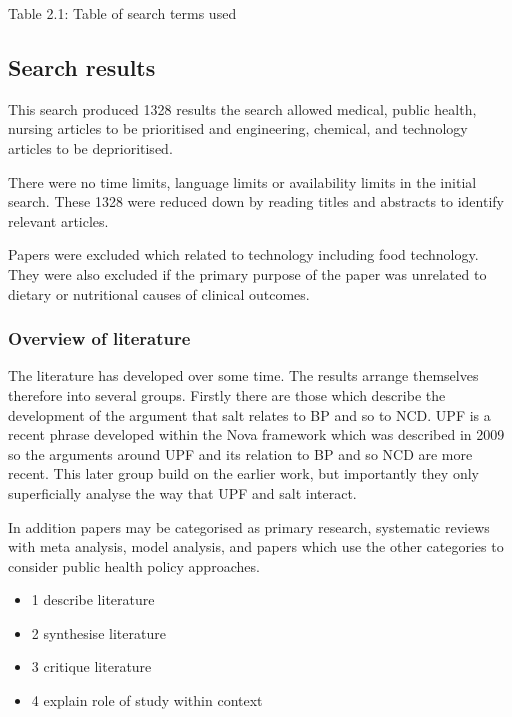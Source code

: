 \documentclass[
]{article}
\providecommand{\tightlist}{%
  \setlength{\itemsep}{0pt}\setlength{\parskip}{0pt}}
\begin{document}
Table 2.1: Table of search terms used

\hypertarget{search-results}{%
\subsection{Search results}\label{search-results}}

This search produced 1328 results the search allowed medical, public
health, nursing articles to be prioritised and engineering, chemical,
and technology articles to be deprioritised.

There were no time limits, language limits or availability limits in the
initial search. These 1328 were reduced down by reading titles and
abstracts to identify relevant articles.

Papers were excluded which related to technology including food
technology. They were also excluded if the primary purpose of the paper
was unrelated to dietary or nutritional causes of clinical outcomes.

\hypertarget{overview-of-literature}{%
\subsubsection{Overview of literature}\label{overview-of-literature}}

The literature has developed over some time. The results arrange
themselves therefore into several groups. Firstly there are those which
describe the development of the argument that salt relates to BP and so
to NCD. UPF is a recent phrase developed within the Nova framework which
was described in 2009 so the arguments around UPF and its relation to BP
and so NCD are more recent. This later group build on the earlier work,
but importantly they only superficially analyse the way that UPF and
salt interact.

In addition papers may be categorised as primary research, systematic
reviews with meta analysis, model analysis, and papers which use the
other categories to consider public health policy approaches.

\begin{itemize}
\tightlist
\item
  1 describe literature
\item
  2 synthesise literature
\item
  3 critique literature
\item
  4 explain role of study within context
\end{itemize}
\end{document}
